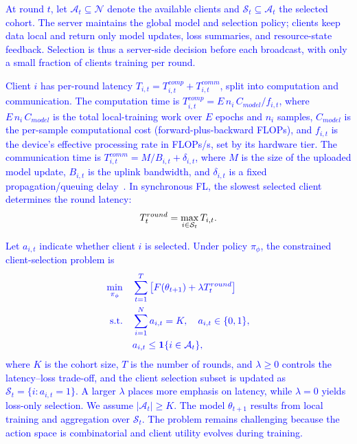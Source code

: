 \documentclass[journal]{IEEEtran}
\newcommand{\revision}[1]{\textcolor{blue}{#1}}
\begin{document}
\revision{At round $t$, let $\mathcal{A}_t \subseteq \mathcal{N}$ denote the available clients and $\mathcal{S}_t \subseteq \mathcal{A}_t$ the selected cohort. The server maintains the global model and selection policy; clients keep data local and return only model updates, loss summaries, and resource-state feedback. Selection is thus a server-side decision before each broadcast, with only a small fraction of clients training per round.}

\revision{Client $i$ has per-round latency $T_{i,t}=T_{i,t}^{comp}+T_{i,t}^{comm}$, split into computation and communication. The computation time is $T_{i,t}^{comp} = E\, n_i\, C_{model}/f_{i,t}$, where $E\, n_i\, C_{model}$ is the total local-training work over $E$ epochs and $n_i$ samples, $C_{model}$ is the per-sample computational cost (forward-plus-backward FLOPs), and $f_{i,t}$ is the device's effective processing rate in FLOPs/s, set by its hardware tier. The communication time is $T_{i,t}^{comm} = M/B_{i,t} + \delta_{i,t}$, where $M$ is the size of the uploaded model update, $B_{i,t}$ is the uplink bandwidth, and $\delta_{i,t}$ is a fixed propagation/queuing delay~\cite{nishio2019client}. %
In synchronous FL, the slowest selected client determines the round latency:}
\begin{equation}
	\color{black}
	T_t^{round} = \max_{i \in \mathcal{S}_t} T_{i,t}.
	\label{eq:round_latency}
\end{equation}


\revision{Let $a_{i,t}$ indicate whether client $i$ is selected. Under policy $\pi_\phi$, the constrained client-selection problem is}
\begin{equation}
	\color{blue}
	\begin{aligned}
		\min_{\pi_\phi}\quad & \sum_{t=1}^{T} \left[F(\theta_{t+1}) + \lambda T_t^{round}\right] \\
		\text{s.t.}\quad & \sum_{i=1}^{N} a_{i,t}=K,\quad a_{i,t}\in\{0,1\}, \\
		& a_{i,t}\leq \mathbf{1}\{i\in\mathcal{A}_t\},		
	\end{aligned}
	\label{eq:bi_objective}
\end{equation}
\revision{where $K$ is the cohort size, $T$ is the number of rounds, and $\lambda \geq 0$ controls the latency--loss trade-off, and the client selection subset is updated as $\mathcal{S}_t=\{i:a_{i,t}=1\}$. A larger $\lambda$ places more emphasis on latency, while $\lambda=0$ yields loss-only selection. We assume $|\mathcal{A}_t|\geq K$. The model $\theta_{t+1}$ results from local training and aggregation over $\mathcal{S}_t$. The problem remains challenging because the action space is combinatorial and client utility evolves during training.}
\end{document}
